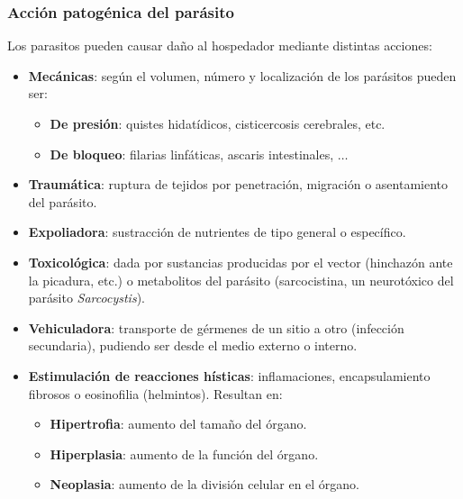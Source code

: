 \subsubsection{Acción patogénica del parásito}
Los parasitos pueden causar daño al hospedador mediante distintas acciones:
\begin{itemize}[itemsep=0pt,parsep=0pt,topsep=0pt,partopsep=0pt]
	\item \textbf{Mecánicas}: según el volumen, número y localización de los parásitos pueden ser:
	\begin{itemize}[itemsep=0pt,parsep=0pt,topsep=0pt,partopsep=0pt]
		\item\textbf{De presión}: quistes hidatídicos, cisticercosis cerebrales, etc.
		\item\textbf{De bloqueo}: filarias linfáticas, ascaris intestinales, $\dots$
	\end{itemize}
	\item\textbf{Traumática}: ruptura de tejidos por penetración, migración o asentamiento del parásito.
	\item\textbf{Expoliadora}: sustracción de nutrientes de tipo general o específico.
	\item\textbf{Toxicológica}: dada por sustancias producidas por el vector (hinchazón ante la picadura, etc.) o metabolitos del parásito (sarcocistina, un neurotóxico del parásito \textit{Sarcocystis}).
	\item\textbf{Vehiculadora}: transporte de gérmenes de un sitio a otro (infección secundaria), pudiendo ser desde el medio externo o interno.
	\item\textbf{Estimulación de reacciones hísticas}: inflamaciones, encapsulamiento fibrosos o eosinofilia (helmintos). Resultan en:
	\begin{itemize}[itemsep=0pt,parsep=0pt,topsep=0pt,partopsep=0pt]
		\item\textbf{Hipertrofia}: aumento del tamaño del órgano.
		\item\textbf{Hiperplasia}: aumento de la función del órgano.
		\item\textbf{Neoplasia}: aumento de la división celular en el órgano.
	\end{itemize}
\end{itemize}
